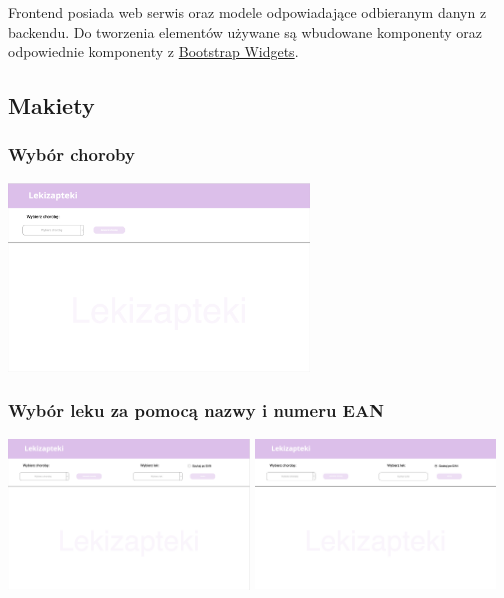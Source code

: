 \documentclass{article}
\begin{document}
  Frontend posiada web serwis oraz modele odpowiadające odbieranym danyn z backendu.
  Do tworzenia elementów używane są wbudowane komponenty oraz odpowiednie komponenty z
  \href{https://ng-bootstrap.github.io/#/home}{Bootstrap Widgets}.

    \subsection{Makiety}
      \subsubsection{Wybór choroby}
      \includegraphics[width=8cm, height=5cm]{lekizapteki-wybor-choroby}

      \subsubsection{Wybór leku za pomocą nazwy i numeru EAN}
      \includegraphics[width=6.4cm, height=4cm]{lekizapteki-wybor-leku-nazwa}
      \includegraphics[width=6.4cm, height=4cm]{lekizapteki-wybor-leku-ean}
\end{document}

